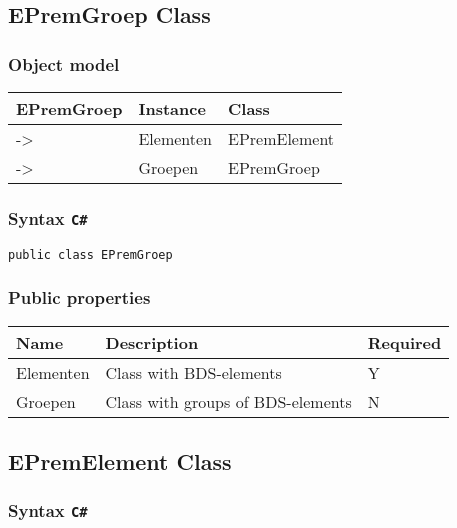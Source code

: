 \documentclass[
]{book}
\begin{document}
\hypertarget{epremgroep-class}{%
\subsection{EPremGroep Class}\label{epremgroep-class}}

\hypertarget{object-model-1}{%
\subsubsection{Object model}\label{object-model-1}}

\begin{longtable}[]{@{}lll@{}}
\toprule
EPremGroep & Instance & Class \\
\midrule
\endhead
-\textgreater{} & Elementen & EPremElement \\
-\textgreater{} & Groepen & EPremGroep \\
\bottomrule
\end{longtable}

\hypertarget{syntax-c-1}{%
\subsubsection{\texorpdfstring{Syntax \texttt{C\#}}{Syntax C\#}}\label{syntax-c-1}}

\texttt{public\ class\ EPremGroep}

\hypertarget{public-properties-1}{%
\subsubsection{Public properties}\label{public-properties-1}}

\begin{longtable}[]{@{}lll@{}}
\toprule
Name & Description & Required \\
\midrule
\endhead
Elementen & Class with BDS-elements & Y \\
Groepen & Class with groups of BDS-elements & N \\
\bottomrule
\end{longtable}

\hypertarget{epremelement-class}{%
\subsection{EPremElement Class}\label{epremelement-class}}

\hypertarget{syntax-c-2}{%
\subsubsection{\texorpdfstring{Syntax \texttt{C\#}}{Syntax C\#}}\label{syntax-c-2}}
\end{document}
